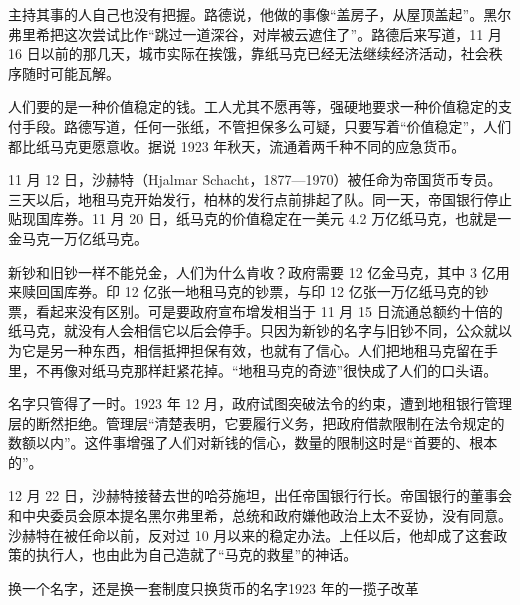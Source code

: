 主持其事的人自己也没有把握。路德说，他做的事像“盖房子，从屋顶盖起”。黑尔弗里希把这次尝试比作“跳过一道深谷，对岸被云遮住了”\cite{bresciani1937}。路德后来写道，11 月 16 日以前的那几天，城市实际在挨饿，靠纸马克已经无法继续经济活动，社会秩序随时可能瓦解\cite{bresciani1937}。

人们要的是一种价值稳定的钱。工人尤其不愿再等，强硬地要求一种价值稳定的支付手段\cite{bresciani1937}。路德写道，任何一张纸，不管担保多么可疑，只要写着“价值稳定”，人们都比纸马克更愿意收。据说 1923 年秋天，流通着两千种不同的应急货币\cite{bresciani1937}。

11 月 12 日，沙赫特（Hjalmar Schacht，1877—1970）被任命为帝国货币专员\cite{schacht2005}。三天以后，地租马克开始发行，柏林的发行点前排起了队\cite{bundesarchiv1923}。同一天，帝国银行停止贴现国库券\cite{sargent1982}。11 月 20 日，纸马克的价值稳定在一美元 4.2 万亿纸马克，也就是一金马克一万亿纸马克\cite{bresciani1937}。

新钞和旧钞一样不能兑金，人们为什么肯收？政府需要 12 亿金马克，其中 3 亿用来赎回国库券。印 12 亿张一地租马克的钞票，与印 12 亿张一万亿纸马克的钞票，看起来没有区别。可是要政府宣布增发相当于 11 月 15 日流通总额约十倍的纸马克，就没有人会相信它以后会停手。只因为新钞的名字与旧钞不同，公众就以为它是另一种东西，相信抵押担保有效，也就有了信心。人们把地租马克留在手里，不再像对纸马克那样赶紧花掉。“地租马克的奇迹”很快成了人们的口头语\cite{bresciani1937}。

名字只管得了一时。1923 年 12 月，政府试图突破法令的约束，遭到地租银行管理层的断然拒绝\cite{bresciani1937}。管理层“清楚表明，它要履行义务，把政府借款限制在法令规定的数额以内”\cite{sargent1982}。这件事增强了人们对新钱的信心，数量的限制这时是“首要的、根本的”\cite{bresciani1937}。

12 月 22 日，沙赫特接替去世的哈芬施坦，出任帝国银行行长\cite{schacht2005}。帝国银行的董事会和中央委员会原本提名黑尔弗里希，总统和政府嫌他政治上太不妥协，没有同意\cite{helfferich1969}。沙赫特在被任命以前，反对过 10 月以来的稳定办法。上任以后，他却成了这套政策的执行人，也由此为自己造就了“马克的救星”的神话\cite{schacht2005}。

\begin{compare}{换一个名字，还是换一套制度}{只换货币的名字}{1923 年的一揽子改革}
\end{compare}

